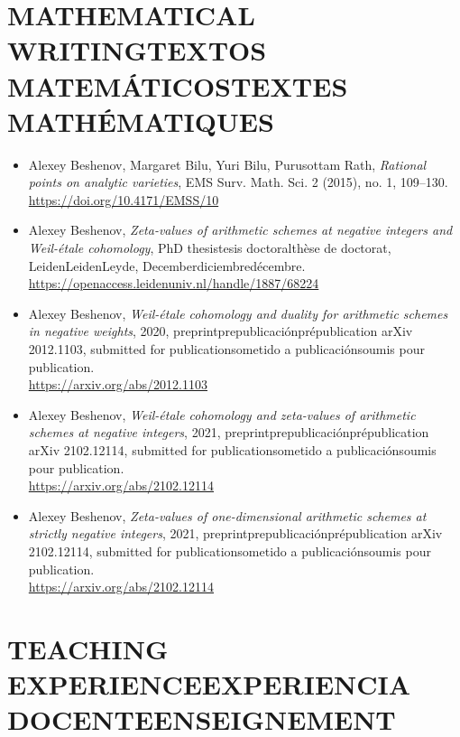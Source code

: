 \documentclass{article}
\newcommand{\biling}[3]{\ifdefined\english#1\fi\ifdefined\spanish#2\fi\ifdefined\french#3\fi}
\begin{document}
{\color{RoyalBlue}\section*{\biling{MATHEMATICAL WRITING}{TEXTOS MATEMÁTICOS}{TEXTES MATHÉMATIQUES}}}

\begin{itemize}
\item Alexey Beshenov, Margaret Bilu, Yuri Bilu, Purusottam Rath,
  \emph{Rational points on analytic varieties},
  EMS Surv. Math. Sci. 2 (2015), no. 1, 109–130.\\
  \url{https://doi.org/10.4171/EMSS/10}

\item Alexey Beshenov,
  \emph{Zeta-values of arithmetic schemes at negative integers and Weil-étale cohomology},
  \biling{PhD thesis}{tesis doctoral}{thèse de doctorat}, \biling{Leiden}{Leiden}{Leyde}, \biling{December}{diciembre}{décembre} 2018.\\
  \url{https://openaccess.leidenuniv.nl/handle/1887/68224}

\item Alexey Beshenov,
  \emph{Weil-étale cohomology and duality for arithmetic schemes in negative weights},
  2020, \biling{preprint}{prepublicación}{prépublication} arXiv 2012.1103,
  \biling{submitted for publication}{sometido a publicación}{soumis pour publication}.\\
  \url{https://arxiv.org/abs/2012.1103}

\item Alexey Beshenov,
  \emph{Weil-étale cohomology and zeta-values of arithmetic schemes at negative integers},
  2021, \biling{preprint}{prepublicación}{prépublication} arXiv 2102.12114,
  \biling{submitted for publication}{sometido a publicación}{soumis pour publication}.\\
  \url{https://arxiv.org/abs/2102.12114}

\item Alexey Beshenov,
  \emph{Zeta-values of one-dimensional arithmetic schemes at strictly negative integers},
  2021, \biling{preprint}{prepublicación}{prépublication} arXiv 2102.12114,
  \biling{submitted for publication}{sometido a publicación}{soumis pour publication}.\\
  \url{https://arxiv.org/abs/2102.12114}
\end{itemize}

{\color{RoyalBlue}\section*{\biling{TEACHING EXPERIENCE}{EXPERIENCIA DOCENTE}{ENSEIGNEMENT}}}
\end{document}
